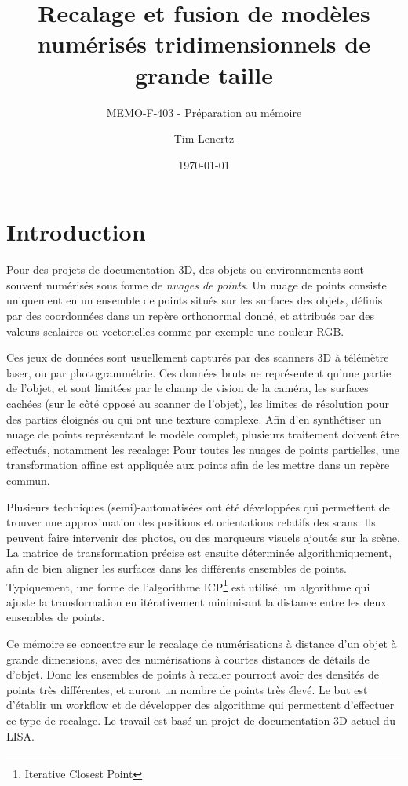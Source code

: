 \documentclass[a4paper,10pt]{scrreprt}
\begin{document}
\title{Recalage et fusion de modèles numérisés tridimensionnels de grande taille}
\subtitle{MEMO-F-403 - Préparation au mémoire}
\author{Tim Lenertz}
\date{\today}
\maketitle

\tableofcontents

\chapter{Introduction}
Pour des projets de documentation 3D, des objets ou environnements sont souvent numérisés sous forme de \emph{nuages de points}. Un nuage de points consiste uniquement en un ensemble de points situés sur les surfaces des objets, définis par des coordonnées dans un repère orthonormal donné, et attribués par des valeurs scalaires ou vectorielles comme par exemple une couleur RGB.

Ces jeux de données sont usuellement capturés par des scanners 3D à télémètre laser, ou par photogrammétrie. Ces données bruts ne représentent qu'une partie de l'objet, et sont limitées par le champ de vision de la caméra, les surfaces cachées (sur le côté opposé au scanner de l'objet), les limites de résolution pour des parties éloignés ou qui ont une texture complexe. Afin d'en synthétiser un nuage de points représentant le modèle complet, plusieurs traitement doivent être effectués, notamment les recalage: Pour toutes les nuages de points partielles, une transformation affine est appliquée aux points afin de les mettre dans un repère commun.

Plusieurs techniques (semi)-automatisées ont été développées qui permettent de trouver une approximation des positions et orientations relatifs des scans. Ils peuvent faire intervenir des photos, ou des marqueurs visuels ajoutés sur la scène. La matrice de transformation précise est ensuite déterminée algorithmiquement, afin de bien aligner les surfaces dans les différents ensembles de points. Typiquement, une forme de l'algorithme ICP\footnote{Iterative Closest Point} est utilisé, un algorithme qui ajuste la transformation en itérativement minimisant la distance entre les deux ensembles de points.

Ce mémoire se concentre sur le recalage de numérisations à distance d'un objet à grande dimensions, avec des numérisations à courtes distances de détails de d'objet. Donc les ensembles de points à recaler pourront avoir des densités de points très différentes, et auront un nombre de points très élevé. Le but est d'établir un workflow et de développer des algorithme qui permettent d'effectuer ce type de recalage. Le travail est basé un projet de documentation 3D actuel du LISA. 
\end{document}
